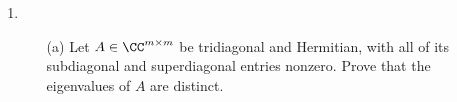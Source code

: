 \documentclass[11pt]{article}
\begin{document}
\begin{enumerate}
\begin{enumerate}
                This is false.
                If
                \[
                    A =
                    \begin{bmatrix}
                        1 & 0 & 0 \\
                        0 & -2 & 0 \\
                        0 & 0 & -2 \\
                    \end{bmatrix}, 
                \]
                then $A$ is Hermition, the eigevalues of $A$ are $\set{1, -2, -2}$,
                but the singular values of $A$ are $\set{1, 2, 2}$.
                If $A$ is Hermitian than the singular values are the absolute
                values of the eigenvalues.

            \item %
                If $A$ is diagonalizable and all eigenvalues are equal, then $A$
                is diagonal.

                \begin{proof}
                    Let $A$ be diagonalizable with all eigenvalues equal.
                    There exists some matrix $X$ such that $A = X\Lambda X^{-1}$.
                    Since all of the eigenvalues of $A$ are the same,
                    $\Lambda = \lambda I$.
                    Therefore
                    $A = X \lambda I X^{-1} = \lambda X X^{-1} = \lambda I$, so
                    $A$ is diagonal.
                \end{proof}
        \end{enumerate}

    \item %
        \begin{enumerate}
            \item[(a)] %
                Let $A \in \CC^{m \times m}$ be tridiagonal and Hermitian, with
                all of its subdiagonal and superdiagonal entries nonzero.
                Prove that the eigenvalues of $A$ are distinct.



\end{enumerate}
\end{enumerate}
\end{document}
